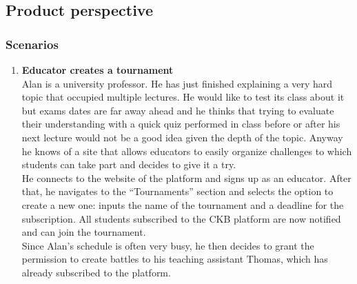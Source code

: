 \subsection{Product perspective}
\subsubsection{Scenarios}
\begin{enumerate}[label=\textbf{\arabic*}.]
    \item \textbf{ Educator creates a tournament}\\Alan is a university professor. He has just finished explaining a very hard topic that occupied multiple lectures. He would like to test its class about it but exams dates are far away ahead and he thinks that trying to evaluate their understanding with a quick quiz performed in class before or after his next lecture would not be a good idea given the depth of the topic. Anyway he knows of a site that allows educators to easily organize challenges to which students can take part and decides to give it a try.\\He connects to the website of the platform and signs up as an educator. After that, he navigates to the “Tournaments” section and selects the option to create a new one: inputs the name of the tournament and a deadline for the subscription. All students subscribed to the CKB platform are now notified and can join the tournament.\\Since Alan’s schedule is often very busy, he then decides to grant the permission to create battles to his teaching assistant Thomas, which has already subscribed to the platform.

\end{enumerate}
